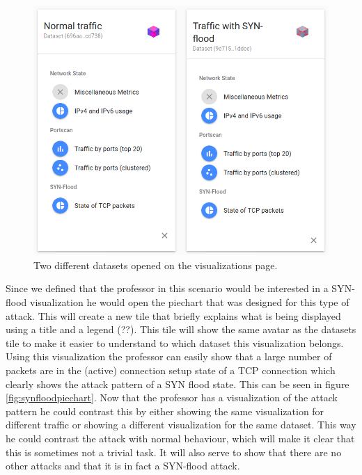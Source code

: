 \begin{figure}[datasettiles]
    \centering
    \includegraphics[width=13cm]{images/evaluation-dataset-tiles.png}
    \caption{Two different datasets opened on the visualizations page.}
    \label{fig:datasettiles}
\end{figure}
Since we defined that the professor in this scenario would be interested in a SYN-flood visualization he would open the piechart that was designed for this type of attack. This will create a new tile that briefly explains what is being displayed using a title and a legend (??). This tile will show the same avatar as the datasets tile to make it easier to understand to which dataset this visualization belongs. Using this visualization the professor can easily show that a large number of packets are in the (active) connection setup state of a TCP connection which clearly shows the attack pattern of a SYN flood state. This can be seen in figure \ref{fig:synfloodpiechart}. Now that the professor has a visualization of the attack pattern he could contrast this by either showing the same visualization for different traffic or showing a different visualization for the same dataset. This way he could contrast the attack with normal behaviour, which will make it clear that this is sometimes not a trivial task. It will also serve to show that there are no other attacks and that it is in fact a SYN-flood attack.

